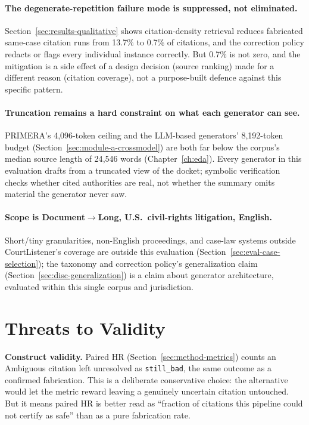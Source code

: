 \paragraph{The degenerate-repetition failure mode is suppressed, not eliminated.} Section~\ref{sec:results-qualitative} shows citation-density retrieval reduces fabricated same-case citation runs from 13.7\% to 0.7\% of citations, and the correction policy redacts or flags every individual instance correctly. But 0.7\% is not zero, and the mitigation is a side effect of a design decision (source ranking) made for a different reason (citation coverage), not a purpose-built defence against this specific pattern.

\paragraph{Truncation remains a hard constraint on what each generator can see.} PRIMERA's 4{,}096-token ceiling and the LLM-based generators' 8{,}192-token budget (Section~\ref{sec:module-a-crossmodel}) are both far below the corpus's median source length of 24{,}546 words (Chapter~\ref{ch:eda}). Every generator in this evaluation drafts from a truncated view of the docket; symbolic verification checks whether cited authorities are real, not whether the summary omits material the generator never saw.

\paragraph{Scope is Document$\rightarrow$Long, U.S.\ civil-rights litigation, English.} Short/tiny granularities, non-English proceedings, and case-law systems outside CourtListener's coverage are outside this evaluation (Section~\ref{sec:eval-case-selection}); the taxonomy and correction policy's generalization claim (Section~\ref{sec:disc-generalization}) is a claim about generator architecture, evaluated within this single corpus and jurisdiction.

\section{Threats to Validity}
\label{sec:disc-threats}

\textbf{Construct validity.} Paired HR (Section~\ref{sec:method-metrics}) counts an Ambiguous citation left unresolved as \texttt{still\_bad}, the same outcome as a confirmed fabrication. This is a deliberate conservative choice: the alternative would let the metric reward leaving a genuinely uncertain citation untouched. But it means paired HR is better read as ``fraction of citations this pipeline could not certify as safe'' than as a pure fabrication rate.

